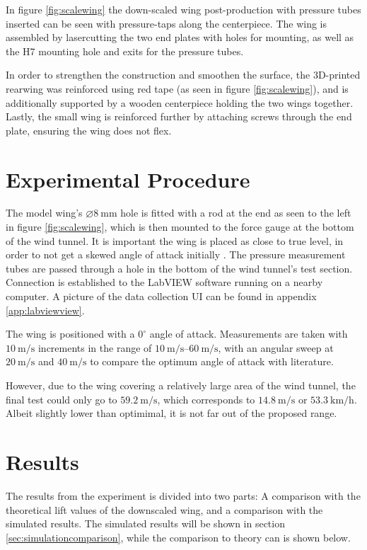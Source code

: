       In figure \ref{fig:scalewing} the down-scaled wing post-production with pressure tubes inserted can be seen with pressure-taps along the centerpiece. The wing is assembled by lasercutting the two end plates with holes for mounting, as well as the H7 mounting hole and exits for the pressure tubes.

      In order to strengthen the construction and smoothen the surface, the 3D-printed rearwing was reinforced using red tape (as seen in figure \ref{fig:scalewing}), and is additionally supported by a wooden centerpiece holding the two wings together. Lastly, the small wing is reinforced further by attaching screws through the end plate, ensuring the wing does not flex.

\section{Experimental Procedure}

  The model wing's $\diameter\SI{8}{\milli\metre}$ hole is fitted with a rod at the end as seen to the left in figure \ref{fig:scalewing}, which is then mounted to the force gauge at the bottom of the wind tunnel. It is important the wing is placed as close to true level, in order to not get a skewed angle of attack initially \cite{truelevel}. The pressure measurement tubes are passed through a hole in the bottom of the wind tunnel's test section. Connection is established to the LabVIEW software running on a nearby computer. A picture of the data collection UI can be found in appendix \ref{app:labviewview}.

  The wing is positioned with a $0^\circ$ angle of attack. Measurements are taken with $\SI{10}{\metre\per\second}$ increments in the range of $\SIrange{10}{60}{\metre\per\second}$, with an angular sweep at $\SI{20}{\metre\per\second}$ and $\SI{40}{\metre\per\second}$ to compare the optimum angle of attack with literature.

  However, due to the wing covering a relatively large area of the wind tunnel, the final test could only go to $\SI{59.2}{\metre\per\second}$, which corresponds to $\SI{14.8}{\metre\per\second}$ or $\SI{53.3}{\kilo\metre\per\hour}$. Albeit slightly lower than optimimal, it is not far out of the proposed range.

\section{Results}

  The results from the experiment is divided into two parts: A comparison with the theoretical lift values of the downscaled wing, and a comparison with the simulated results. The simulated results will be shown in section \ref{sec:simulationcomparison}, while the comparison to theory can is shown below.

